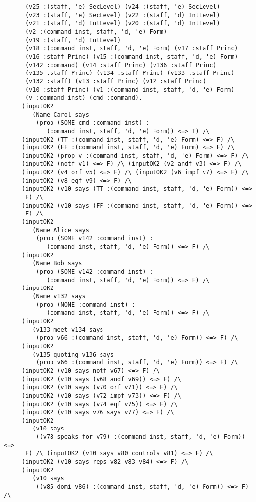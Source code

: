 \documentclass{report}
\begin{document}
\begin{session}
\begin{scriptsize}
\begin{verbatim}
      (v25 :(staff, 'e) SecLevel) (v24 :(staff, 'e) SecLevel)
      (v23 :(staff, 'e) SecLevel) (v22 :(staff, 'd) IntLevel)
      (v21 :(staff, 'd) IntLevel) (v20 :(staff, 'd) IntLevel)
      (v2 :(command inst, staff, 'd, 'e) Form)
      (v19 :(staff, 'd) IntLevel)
      (v18 :(command inst, staff, 'd, 'e) Form) (v17 :staff Princ)
      (v16 :staff Princ) (v15 :(command inst, staff, 'd, 'e) Form)
      (v142 :command) (v14 :staff Princ) (v136 :staff Princ)
      (v135 :staff Princ) (v134 :staff Princ) (v133 :staff Princ)
      (v132 :staff) (v13 :staff Princ) (v12 :staff Princ)
      (v10 :staff Princ) (v1 :(command inst, staff, 'd, 'e) Form)
      (v :command inst) (cmd :command).
     (inputOK2
        (Name Carol says
         (prop (SOME cmd :command inst) :
            (command inst, staff, 'd, 'e) Form)) <=> T) /\
     (inputOK2 (TT :(command inst, staff, 'd, 'e) Form) <=> F) /\
     (inputOK2 (FF :(command inst, staff, 'd, 'e) Form) <=> F) /\
     (inputOK2 (prop v :(command inst, staff, 'd, 'e) Form) <=> F) /\
     (inputOK2 (notf v1) <=> F) /\ (inputOK2 (v2 andf v3) <=> F) /\
     (inputOK2 (v4 orf v5) <=> F) /\ (inputOK2 (v6 impf v7) <=> F) /\
     (inputOK2 (v8 eqf v9) <=> F) /\
     (inputOK2 (v10 says (TT :(command inst, staff, 'd, 'e) Form)) <=>
      F) /\
     (inputOK2 (v10 says (FF :(command inst, staff, 'd, 'e) Form)) <=>
      F) /\
     (inputOK2
        (Name Alice says
         (prop (SOME v142 :command inst) :
            (command inst, staff, 'd, 'e) Form)) <=> F) /\
     (inputOK2
        (Name Bob says
         (prop (SOME v142 :command inst) :
            (command inst, staff, 'd, 'e) Form)) <=> F) /\
     (inputOK2
        (Name v132 says
         (prop (NONE :command inst) :
            (command inst, staff, 'd, 'e) Form)) <=> F) /\
     (inputOK2
        (v133 meet v134 says
         (prop v66 :(command inst, staff, 'd, 'e) Form)) <=> F) /\
     (inputOK2
        (v135 quoting v136 says
         (prop v66 :(command inst, staff, 'd, 'e) Form)) <=> F) /\
     (inputOK2 (v10 says notf v67) <=> F) /\
     (inputOK2 (v10 says (v68 andf v69)) <=> F) /\
     (inputOK2 (v10 says (v70 orf v71)) <=> F) /\
     (inputOK2 (v10 says (v72 impf v73)) <=> F) /\
     (inputOK2 (v10 says (v74 eqf v75)) <=> F) /\
     (inputOK2 (v10 says v76 says v77) <=> F) /\
     (inputOK2
        (v10 says
         ((v78 speaks_for v79) :(command inst, staff, 'd, 'e) Form)) <=>
      F) /\ (inputOK2 (v10 says v80 controls v81) <=> F) /\
     (inputOK2 (v10 says reps v82 v83 v84) <=> F) /\
     (inputOK2
        (v10 says
         ((v85 domi v86) :(command inst, staff, 'd, 'e) Form)) <=> F) /\

\end{verbatim}
\end{scriptsize}
\end{session}
\end{document}
